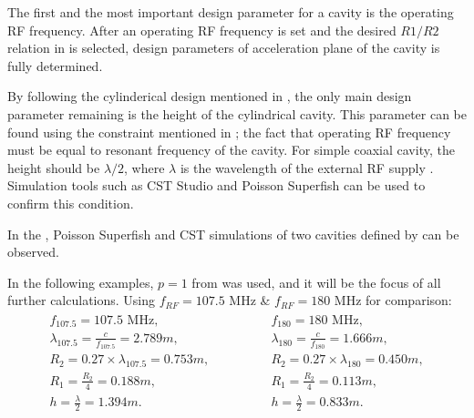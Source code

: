 \documentclass[a4paper,oneside,12pt]{report}
\numberwithin{equation}{chapter}
\begin{document}
The first and the most important design parameter for a cavity is the operating RF frequency.
After an operating RF frequency is set and the desired $R1/R2$ relation in  is selected, design parameters of acceleration plane of the cavity is fully determined.

By following the cylinderical design mentioned in , the only main design parameter remaining is the height of the cylindrical cavity.
This parameter can be found using the constraint mentioned in ; the fact that operating RF frequency must be equal to resonant frequency of the cavity.
For simple coaxial cavity, the height should be $\lambda/2$, where $\lambda$ is the wavelength of the external RF supply \cite{rhodo_pottier}.
Simulation tools such as CST Studio and Poisson Superfish can be used to confirm this condition.

In the , 
Poisson Superfish and CST simulations of two cavities defined by  can be observed.

In the following examples, $p=1$ from  was used, and it will be the focus of all further calculations.
Using $f_{RF}=107.5$ MHz \& $f_{RF}=180$ MHz for comparison:
\vspace{-30pt}
\begin{eqnarray} \label{eq:107_180_MHZ_cavity_design_parameters}
    \begin{aligned}
        f_{107.5} = 107.5 \textrm{ MHz}  , \\
        \lambda_{107.5}  = \frac{c}{f_{107.5}} = 2.789 m   ,\\
        R_2 = 0.27 \times \lambda_{107.5} = 0.753 m   ,\\
        R_1 = \frac{R_2}{4} = 0.188 m   ,\\
        h = \frac{\lambda}{2} = 1.394 m .
    \end{aligned}
    \qquad\qquad
    \begin{aligned}
        f_{180} = 180 \textrm{ MHz}   ,\\
        \lambda_{180}  = \frac{c}{f_{180}} = 1.666 m  , \\
        R_2 = 0.27 \times\lambda_{180} = 0.450 m  , \\
        R_1 = \frac{R_2}{4} = 0.113 m  , \\
        h = \frac{\lambda}{2} = 0.833 m . 
    \end{aligned}
\end{eqnarray}
\end{document}
